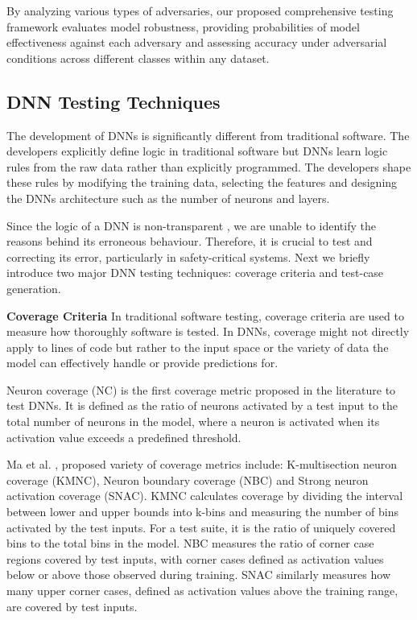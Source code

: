 \documentclass[10pt, conference, a4paper, final]{IEEEtran}
\begin{document}
By analyzing various types of adversaries, our proposed comprehensive testing framework evaluates model robustness, providing probabilities of model effectiveness against each adversary and assessing accuracy under adversarial conditions across different classes within any dataset.


\subsection {DNN Testing Techniques}
The development of DNNs is significantly different from traditional software. The developers explicitly define logic in traditional software but DNNs learn logic rules from the raw data rather than explicitly programmed. The developers shape these rules by modifying the training data, selecting the features and designing the DNNs architecture such as the number of neurons and layers.

Since the logic of a DNN is non-transparent \cite{deepxplore}, we are unable to identify the reasons behind its erroneous behaviour. Therefore, it is crucial to test and correcting its error, particularly in safety-critical systems. Next we briefly introduce two major DNN testing techniques: coverage criteria and test-case generation.

\smallskip\noindent%
\textbf{Coverage Criteria}
In traditional software testing, coverage criteria are used to measure how thoroughly software is tested. In DNNs, coverage might not directly apply to lines of code but rather to the input space or the variety of data the model can effectively handle or provide predictions for.

Neuron coverage (NC) \cite{deepxplore} is the first coverage metric proposed in the literature to test DNNs. It is defined as the ratio of neurons activated by a test input to the total number of neurons in the model, where a neuron is activated when its activation value exceeds a predefined threshold. 

Ma et al. \cite{deepguage}, proposed variety of coverage metrics include: K-multisection neuron coverage (KMNC), Neuron boundary coverage (NBC) and Strong neuron activation coverage (SNAC). KMNC calculates coverage by dividing the interval between lower and upper bounds into k-bins and measuring the number of bins activated by the test inputs. For a test suite, it is the ratio of uniquely covered bins to the total bins in the model. NBC measures the ratio of corner case regions covered by test inputs, with corner cases defined as activation values below or above those observed during training. SNAC similarly measures how many upper corner cases, defined as activation values above the training range, are covered by test inputs. 
\end{document}
